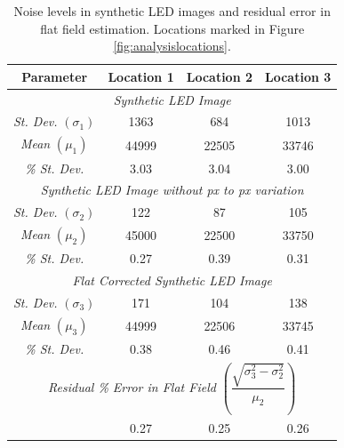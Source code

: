 \documentclass[11pt,a4paper]{article}
\begin{document}
	\begin{table}
		\centering
		\begin{tabular}{|c|c|c|c|}
			\hline
			\textbf{Parameter} &\textbf{ Location 1 }&\textbf{ Location 2} & \textbf{Location 3} \\ 
			\hline
			\hline 
			\multicolumn{4}{|c|}{\textit{Synthetic LED Image}} \\ 
			\hline
			\hline 
			\textit{St. Dev.} $(\sigma_1)$ &1363  & 684 & 1013 \\ 
			\hline 
			\textit{Mean }$(\mu_1)$& 44999 & 22505 & 33746 \\ 
			\hline 
			\textit{\% St. Dev.} &3.03  & 3.04 & 3.00 \\ 
			\hline 
			\hline
			\multicolumn{4}{|c|}{\textit{Synthetic LED Image without px to px variation}} \\ 
			\hline
			\hline 
			\textit{St. Dev.} $(\sigma_2)$&122  & 87 & 105 \\ 
			\hline 
			\textit{Mean} $(\mu_2)$& 45000 & 22500 & 33750 \\ 
			\hline 
			\textit{\% St. Dev.}& 0.27 & 0.39 & 0.31 \\ 
			\hline 
			\hline
			\multicolumn{4}{|c|}{\textit{Flat Corrected Synthetic LED Image}} \\ 
			\hline
			\hline 
			\textit{St. Dev. }$(\sigma_3)$& 171 & 104 & 138 \\ 
			\hline 
			\textit{Mean} $(\mu_3)$& 44999 & 22506 & 33745 \\ 
			\hline 
			\textit{\% St. Dev.}& 0.38 & 0.46 & 0.41 \\ 
			\hline 
			\hline
			\multicolumn{4}{|c|}{\textit{Residual \% Error in Flat Field} $\left(\dfrac{\sqrt{\sigma_3^2-\sigma_2^2}}{\mu_2}\right)$} \\
			\hline
			\hline
			& 0.27 & 0.25 & 0.26 \\ 
			\hline
		\end{tabular} 
		\caption{Noise levels in synthetic LED images and residual error in flat field estimation. Locations marked in Figure \ref{fig:analysislocations}. }
		\label{table:compare}
	\end{table}
\end{document}
